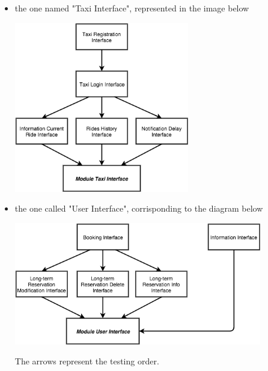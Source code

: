 	\begin{itemize}
		\item the one named "Taxi Interface", represented in the image below
		    \begin{center}
			    \includegraphics[width=0.60\textwidth]{./images/ModuleTaxiInterface.png}~\\[1.5cm] 
			\end{center}
		\item the one called "User Interface", corrisponding to the diagram below
		    \begin{center}
			    \includegraphics[width=0.85\textwidth]{./images/ModuleUserInterface.png}~\\[1.5cm] 
			\end{center}
		The arrows represent the testing order.
	\end{itemize}
